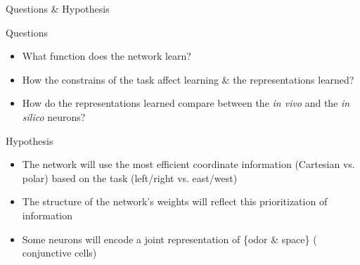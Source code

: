 \documentclass[bigger]{beamer}
\begin{document}
\begin{frame}[label={sec:org8a02257}]{Questions \& Hypothesis}
\begin{exampleblock}{Questions}
\begin{itemize}
\footnotesize
\setlength\itemsep{0em}
\item What \alert{function} does the network learn?
\item How the constrains of the task affect learning \& the representations learned?
\item How do the representations learned compare between the \emph{in vivo} and the \emph{in silico} neurons?
\end{itemize}
\end{exampleblock}
\pause
\begin{exampleblock}{Hypothesis}
\begin{itemize}
\footnotesize
\setlength\itemsep{0em}
\item The network will use the \alert{most efficient coordinate information} (Cartesian vs. polar) based on the task (left/right vs. east/west)
\item The structure of the network's weights will reflect this prioritization of information
\item Some neurons will encode a \alert{joint representation of \{odor \& space\}} (\ie{} conjunctive cells)
\end{itemize}
\end{exampleblock}
\end{frame}
\end{document}
